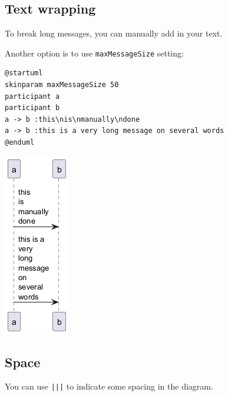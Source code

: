 \subsection{Text wrapping}


To break long messages, you can manually add \texttt{\textbackslashn} in your text.


Another option is to use \texttt{maxMessageSize} setting:


\begin{verbatim}
@startuml
skinparam maxMessageSize 50
participant a
participant b
a -> b :this\nis\nmanually\ndone
a -> b :this is a very long message on several words
@enduml
\end{verbatim}
\begin{center}
\includegraphics[scale=0.60]{imgw/img-e1dfc5c0f251a2231037cc984b546a1b.png}
\end{center}
%
%
\subsection{Space}




You can use \texttt{|||} to indicate some spacing in the diagram.


